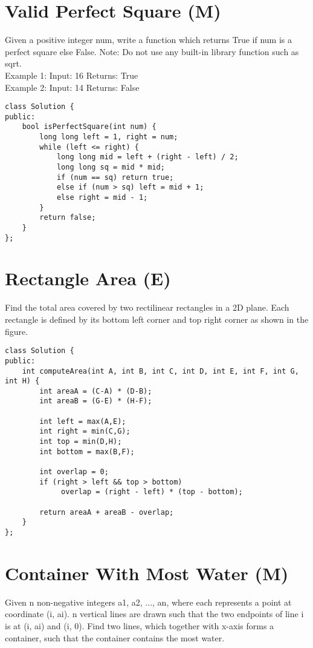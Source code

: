 \section{Valid Perfect Square (M)}
Given a positive integer num, write a function which returns True if num is a perfect square else False. Note: Do not use any built-in library function such as sqrt.\\

Example 1:
Input: 16
Returns: True\\

Example 2:
Input: 14
Returns: False\\

\begin{lstlisting}
class Solution {
public:
    bool isPerfectSquare(int num) {
        long long left = 1, right = num;
        while (left <= right) {
            long long mid = left + (right - left) / 2;
            long long sq = mid * mid; 
            if (num == sq) return true;
            else if (num > sq) left = mid + 1;
            else right = mid - 1;
        }
        return false;     
    }
};
\end{lstlisting}


\section{Rectangle Area (E)}
Find the total area covered by two rectilinear rectangles in a 2D plane. Each rectangle is defined by its bottom left corner and top right corner as shown in the figure. \\

\begin{lstlisting}
class Solution {
public:
    int computeArea(int A, int B, int C, int D, int E, int F, int G, int H) {
        int areaA = (C-A) * (D-B);
        int areaB = (G-E) * (H-F);
        
        int left = max(A,E);
        int right = min(C,G);
        int top = min(D,H);
        int bottom = max(B,F);
        
        int overlap = 0;
        if (right > left && top > bottom)
             overlap = (right - left) * (top - bottom);
             
        return areaA + areaB - overlap;
    }
};
\end{lstlisting}


\section{Container With Most Water (M)}
Given n non-negative integers a1, a2, ..., an, where each represents a point at coordinate (i, ai). n vertical lines are drawn such that the two endpoints of line i is at (i, ai) and (i, 0). Find two lines, which together with x-axis forms a container, such that the container contains the most water.\\

